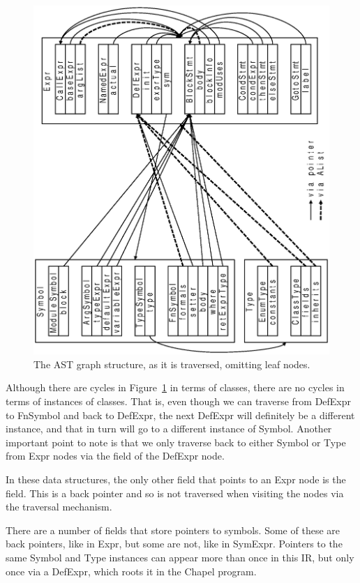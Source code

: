 \documentclass[10pt]{article}
\begin{document}
\begin{figure}[htb]
\includegraphics[angle=270,scale=0.5]{AST.ps}
\caption{The AST graph structure, as it is traversed, omitting leaf nodes.}
\label{fig:ast}
\end{figure}

Although there are cycles in Figure~\ref{fig:ast} in terms of classes,
there are no cycles in terms of instances of classes.  That is, even
though we can traverse from DefExpr to FnSymbol and back to DefExpr,
the next DefExpr will definitely be a different instance, and that in
turn will go to a different instance of Symbol.  Another important
point to note is that we only traverse back to either Symbol or Type
from Expr nodes via the  field of the DefExpr node.

In these data structures, the only other field that points to an Expr
node is the  field.  This is a back pointer and so is
not traversed when visiting the nodes via the traversal mechanism.

There are a number of fields that store pointers to symbols.  Some of
these are back pointers, like  in Expr, but some are
not, like  in SymExpr.  Pointers to the same Symbol and Type
instances can appear more than once in this IR, but only once via a
DefExpr, which roots it in the Chapel program.
\end{document}
